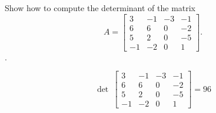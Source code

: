 
\begin{exerciseStatement}


Show how to compute the determinant of the matrix \[A= \left[\begin{array}{cccc}
3 & -1 & -3 & -1 \\
6 & 6 & 0 & -2 \\
5 & 2 & 0 & -5 \\
-1 & -2 & 0 & 1
\end{array}\right] .\].


\end{exerciseStatement}
    
\begin{exerciseAnswer} 
\[\operatorname{det}\  \left[\begin{array}{cccc}
3 & -1 & -3 & -1 \\
6 & 6 & 0 & -2 \\
5 & 2 & 0 & -5 \\
-1 & -2 & 0 & 1
\end{array}\right] = 96 \]
\end{exerciseAnswer}
    

